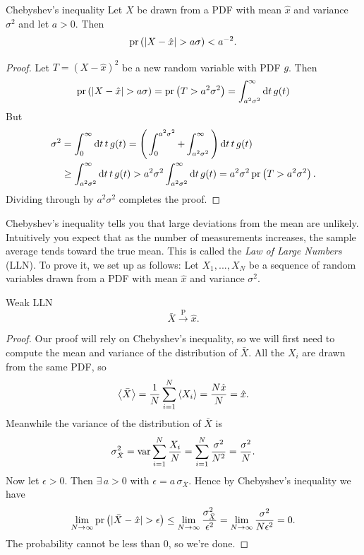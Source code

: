 \begin{theorem}{Chebyshev's inequality}{}
  Let $X$ be drawn from a PDF with mean $\hat{x}$ and variance
  $\sigma^2$ and let $a>0$. Then
  \begin{equation*}
    \pr{|X-\hat{x}|>a\sigma}<a^{-2}.
  \end{equation*}
  \begin{proof}
    Let $T=(X-\hat{x})^2$ be a new random variable with PDF $g$. Then
    \begin{equation*}
      \pr{|X-\hat{x}|>a\sigma}=\pr{T>a^2\sigma^2}
                              =\int_{a^2\sigma^2}^\infty\dd{t}g(t)
    \end{equation*}
    But
    \begin{equation*}
      \begin{aligned}
        \sigma^2&=\int_{0}^\infty\dd{t}t\,g(t)
                =\Bigg(\int_0^{a^2\sigma^2}
                     +\int_{a^2\sigma^2}^\infty\Bigg)\dd{t}t\,g(t)\\
                &\geq\int_{a^2\sigma^2}^\infty\dd{t}t\,g(t)
                >a^2\sigma^2\int_{a^2\sigma^2}^\infty\dd{t}g(t)
                =a^2\sigma^2\pr{T>a^2\sigma^2}.
      \end{aligned}
    \end{equation*}
   Dividing through by $a^2\sigma^2$ completes the proof.
  \end{proof} 
\end{theorem}
Chebyshev's inequality tells you that large deviations from the mean are
unlikely. Intuitively you expect that as the number of measurements
increases, the sample average tends toward the true mean. This is
called the {\it Law of Large Numbers}
(LLN). To prove it, we set up as follows: Let $X_1,...,X_N$ be a sequence 
of random variables drawn from a PDF
with mean $\hat{x}$ and variance $\sigma^2$.
\begin{theorem}{Weak LLN}{}
  $$
    \bar{X}\xrightarrow{\text{P}}\hat{x}.
  $$
  \begin{proof} Our proof will rely on Chebyshev's inequality, so we will
    first need to compute the mean and variance of the distribution of
    $\bar{X}$. All the $X_i$ are drawn from the same PDF, so
    $$
      \ev{\bar{X}}=\frac{1}{N}\sum_{i=1}^N\ev{X_i}
                  =\frac{N\hat{x}}{N}=\hat{x}.
    $$
    Meanwhile the variance of the distribution of $\bar{X}$ is
    $$
      \sigma^2_{\bar{X}}
      =\operatorname{var}\sum_{i=1}^N \frac{X_i}{N}
      =\sum_{i=1}^N\frac{\sigma^2}{N^2}
      =\frac{\sigma^2}{N}.
    $$
    Now let $\epsilon>0$. Then $\exists\,a>0$ with 
    $\epsilon=a\,\sigma_{\bar{X}}$. Hence by Chebyshev's
    inequality we have
    $$
      \lim_{N\to\infty}\pr{|\bar{X}-\hat{x}|>\epsilon}
       \leq\lim_{N\to\infty}\frac{\sigma^2_{\bar{X}}}{\epsilon^2}
       =\lim_{N\to\infty}\frac{\sigma^2}{N\epsilon^2}=0.
    $$
    The probability cannot be less than 0, so we're done.
  \end{proof}
\end{theorem}
